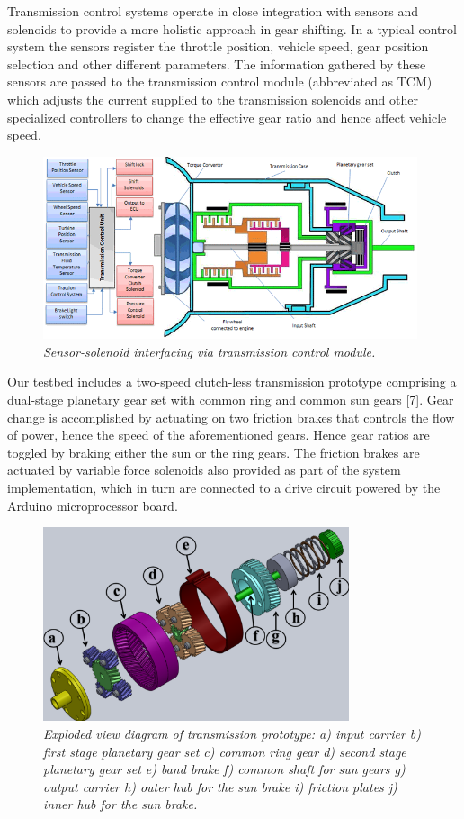 \documentclass{article}
\begin{document}
\begin{flushleft}
Transmission control systems operate in close integration with sensors and solenoids to provide a more holistic approach in gear shifting. In a typical control system the sensors register the throttle position, vehicle speed, gear position selection and other different parameters. The information gathered by these sensors are passed to the transmission control module (abbreviated as TCM) which adjusts the current supplied to the transmission solenoids and other specialized controllers to change the effective gear ratio and hence affect vehicle speed.
\end{flushleft}

\begin{figure}[!ht]
\centering 
\includegraphics[width=11cm]{fig_5.png}
\caption{\small \sl Sensor-solenoid interfacing via transmission control module.}  
\end{figure}

\begin{flushleft}
Our testbed includes a two-speed clutch-less transmission prototype comprising a dual-stage planetary gear set with common ring and common sun gears [7]. Gear change is accomplished by actuating on two friction brakes that controls the flow of power, hence the speed of the aforementioned gears. Hence gear ratios are toggled by braking either the sun or the ring gears. The friction brakes are actuated by variable force solenoids also provided as part of the system implementation, which in turn are connected to a drive circuit powered by the Arduino microprocessor board. 
\end{flushleft}

\begin{figure}[!ht]
\centering 
\includegraphics[width=9cm]{fig_6.png}
\caption{\small \sl Exploded view diagram of transmission prototype: a) input carrier b) first stage planetary gear set c) common ring gear d) second stage planetary gear set e) band brake f) common shaft for sun gears g) output carrier h) outer hub for the sun brake i) friction plates j) inner hub for the sun brake.}  
\end{figure}
\end{document}

